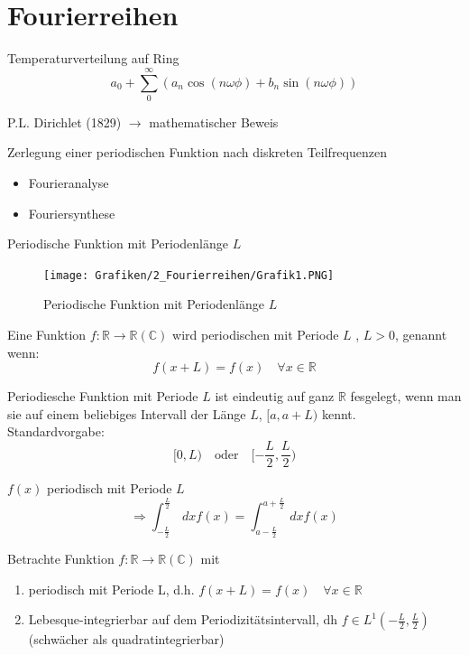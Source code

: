 \section{Fourierreihen}

Temperaturverteilung auf Ring
$$a_0 + \sum_0^\infty (a_n \cos(n\omega\phi) + b_n \sin(n\omega\phi))$$

P.L. Dirichlet (1829) $\rightarrow$ mathematischer Beweis

Zerlegung einer periodischen Funktion nach diskreten Teilfrequenzen
\begin{itemize}
	\item Fourieranalyse
	\item Fouriersynthese
\end{itemize}

Periodische Funktion mit Periodenlänge $L$
\begin{figure}[H]
	\centering
	\texttt{[image: Grafiken/2\_Fourierreihen/Grafik1.PNG]}
	\caption{Periodische Funktion mit Periodenlänge $L$}
	\label{}
\end{figure}

\begin{Def}
	Eine Funktion $f: \mathbb{R}\rightarrow\mathbb{R}(\mathbb{C})$ wird periodischen
	mit Periode $L$ , $L>0$, genannt wenn:
	$$f(x+L) = f(x) \quad \forall x \in \mathbb{R}$$
\end{Def}

\begin{Bem}
	Periodiesche Funktion mit Periode $L$ ist eindeutig auf ganz $\mathbb{R}$ fesgelegt,
	wenn man sie auf einem beliebiges Intervall der Länge $L$, $[a,a+L)$ kennt.\\
	Standardvorgabe:
	$$[0,L) \quad \textrm{oder} \quad [-\frac{L}{2}, \frac{L}{2})$$
\end{Bem}

\begin{Bem}
	$f(x)$ periodisch mit Periode $L$
	$$\Rightarrow \int_{-\frac{L}{2}}^{\frac{L}{2}} \,dx f(x) = \int_{a-\frac{L}{2}}^{a+\frac{L}{2}} \,dx f(x)$$
\end{Bem}

Betrachte Funktion $f: \mathbb{R}\rightarrow\mathbb{R}(\mathbb{C})$ mit
\begin{enumerate}[label=(\roman*)]
	\item periodisch mit Periode L, d.h. $f(x+L) = f(x) \quad \forall x \in \mathbb{R}$
	\item Lebesque-integrierbar auf dem Periodizitätsintervall, dh $f \in L^1(-\frac{L}{2},\frac{L}{2})$ (schwächer als quadratintegrierbar)
\end{enumerate}

